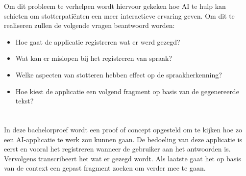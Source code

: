 Om dit probleem te verhelpen wordt hiervoor gekeken hoe AI te hulp kan schieten om stotterpatiënten een meer interactieve ervaring geven. Om dit te realiseren zullen de volgende vragen beantwoord worden:
\begin{itemize}
    \item Hoe gaat de applicatie registreren wat er werd gezegd?
    \item Wat kan er mislopen bij het registreren van spraak?
    \item Welke aspecten van stotteren hebben effect op de spraakherkenning?
    \item Hoe kiest de applicatie een volgend fragment op basis van de gegenereerde tekst?
\end{itemize}


\section{}%
\label{sec:onderzoeksdoelstelling}

In deze bachelorproef wordt een proof of concept opgesteld om te kijken hoe zo een AI-applicatie te werk zou kunnen gaan. De bedoeling van deze applicatie is eerst en vooral het registreren wanneer de gebruiker aan het antwoorden is. Vervolgens transcribeert het wat er gezegd wordt. Als laatste gaat het op basis van de context een gepast fragment zoeken om verder mee te gaan.


\section{}%
\label{sec:opzet-bachelorproef}

